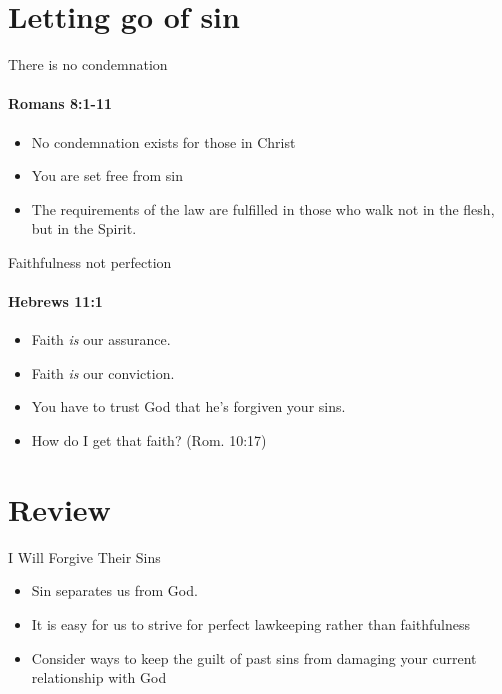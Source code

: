 \section{Letting go of sin}

\begin{frame}{There is no condemnation}
\framesubtitle{Romans 8:1-11}
\begin{itemize}
\item No condemnation exists for those in Christ
\item You are set free from sin
\item The requirements of the law are fulfilled in those who walk not in the flesh, but in the Spirit.
\end{itemize}

\end{frame}

\begin{frame}{Faithfulness not perfection}
\framesubtitle{Hebrews 11:1}

\begin{itemize}
\item Faith \emph{is} our assurance.
\item Faith \emph{is} our conviction.
\item You have to trust God that he's forgiven your sins.
\item How do I get that faith? (Rom. 10:17)
\end{itemize}

\end{frame}

\section{Review}

\begin{frame}{I Will Forgive Their Sins}
	\begin{itemize}
		\item Sin separates us from God.
		\item It is easy for us to strive for perfect lawkeeping rather than faithfulness
		
		\item Consider ways to keep the guilt of past sins from damaging your current relationship with God
	\end{itemize}
	
\end{frame}
